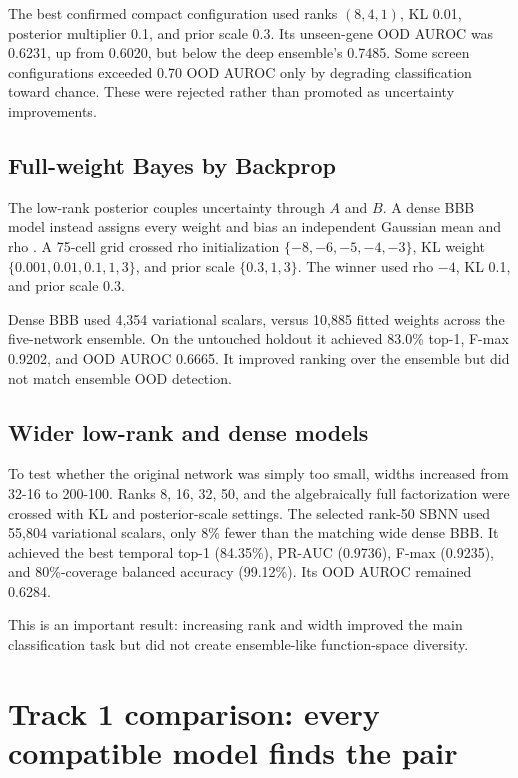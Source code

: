 \documentclass[11pt]{article}
\begin{document}
The best confirmed compact configuration used ranks $(8,4,1)$, KL 0.01, posterior multiplier 0.1, and prior scale 0.3. Its unseen-gene OOD AUROC was 0.6231, up from 0.6020, but below the deep ensemble's 0.7485. Some screen configurations exceeded 0.70 OOD AUROC only by degrading classification toward chance. These were rejected rather than promoted as uncertainty improvements.

\subsection{Full-weight Bayes by Backprop}

The low-rank posterior couples uncertainty through $A$ and $B$. A dense BBB model instead assigns every weight and bias an independent Gaussian mean and rho \citep{blundell2015}. A 75-cell grid crossed rho initialization $\{-8,-6,-5,-4,-3\}$, KL weight $\{0.001,0.01,0.1,1,3\}$, and prior scale $\{0.3,1,3\}$. The winner used rho $-4$, KL 0.1, and prior scale 0.3.

Dense BBB used 4,354 variational scalars, versus 10,885 fitted weights across the five-network ensemble. On the untouched holdout it achieved 83.0\% top-1, F-max 0.9202, and OOD AUROC 0.6665. It improved ranking over the ensemble but did not match ensemble OOD detection.

\subsection{Wider low-rank and dense models}

To test whether the original network was simply too small, widths increased from 32-16 to 200-100. Ranks 8, 16, 32, 50, and the algebraically full factorization were crossed with KL and posterior-scale settings. The selected rank-50 SBNN used 55,804 variational scalars, only 8\% fewer than the matching wide dense BBB. It achieved the best temporal top-1 (84.35\%), PR-AUC (0.9736), F-max (0.9235), and 80\%-coverage balanced accuracy (99.12\%). Its OOD AUROC remained 0.6284.

This is an important result: increasing rank and width improved the main classification task but did not create ensemble-like function-space diversity.

\section{Track 1 comparison: every compatible model finds the pair}
\end{document}
